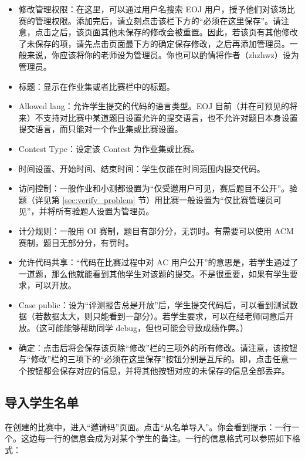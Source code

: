 \documentclass[oneside]{book}
\begin{document}
\begin{itemize}
  \item 修改管理权限：在这里，可以通过用户名搜索 EOJ 用户，授予他们对该场比赛的管理权限。添加完后，请立刻点击该栏下方的``必须在这里保存''。请注意，点击之后，该页面其他未保存的修改会被重置。因此，若该页有其他修改了未保存的项，请先点击页面最下方的确定保存修改，之后再添加管理员。一般来说，你应该将你的老师设为管理员。你也可以酌情将作者（zhzhwz）设为管理员。
  \item 标题：显示在作业集或者比赛栏中的标题。
  \item Allowed lang：允许学生提交的代码的语言类型。EOJ 目前（并在可预见的将来）不支持对比赛中某道题目设置允许的提交语言，也不允许对题目本身设置提交语言，而只能对一个作业集或比赛设置。
  \item Contest Type：设定该 Contest 为作业集或比赛。
  \item 时间设置、开始时间、结束时间：学生仅能在时间范围内提交代码。
  \item 访问控制：一般作业和小测都设置为``仅受邀用户可见，赛后题目不公开''。验题（详见第 \ref{sec:verify_problem} 节）用比赛一般设置为``仅比赛管理员可见''，并将所有验题人设置为管理员。
  \item 计分规则：一般用 OI 赛制，题目有部分分，无罚时。有需要可以使用 ACM 赛制，题目无部分分，有罚时。
  \item 允许代码共享：``代码在比赛过程中对 AC 用户公开''的意思是，若学生通过了一道题，那么他就能看到其他学生对该题的提交。不是很重要，如果有学生要求，可以开放。
  \item Case public：设为``评测报告总是开放''后，学生提交代码后，可以看到测试数据（若数据太大，则只能看到一部分）。若学生要求，可以在经老师同意后开放。（这可能能够帮助同学 debug，但也可能会导致成绩作弊。）
  \item 确定：点击后将会保存该页除``修改''栏的三项外的所有修改。请注意，该按钮与``修改''栏的三项下的``必须在这里保存''按钮分别是互斥的。即，点击任意一个按钮都会保存对应的信息，并将其他按钮对应的未保存的信息全部丢弃。
\end{itemize}

\subsection{导入学生名单}

\label{ssec:import_student_list}

在创建的比赛中，进入``邀请码''页面。点击``从名单导入''。你会看到提示：一行一个。这边每一行的信息会成为对某个学生的备注。一行的信息格式可以参照如下格式：
\end{document}

